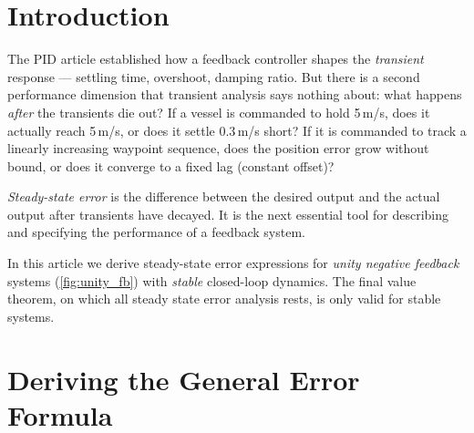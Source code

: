 \documentclass[../../book.tex]{subfiles}
\begin{document}
\graphicspath{{./}}

\section{Introduction}
\label{sec:intro}

The PID article established how a feedback controller shapes the \emph{transient}
response --- settling time, overshoot, damping ratio.  But there is a second
performance dimension that transient analysis says nothing about: what happens
\emph{after} the transients die out?  If a vessel is commanded to hold 5\,m/s,
does it actually reach 5\,m/s, or does it settle 0.3\,m/s short?  If it is
commanded to track a linearly increasing waypoint sequence, does the position
error grow without bound, or does it converge to a fixed lag (constant offset)?

\emph{Steady-state error} is the difference between the desired output and the
actual output after transients have decayed.  It is the next essential tool for
describing and specifying the performance of a feedback system.


In this article we derive steady-state error expressions for
\emph{unity negative feedback} systems (\cref{fig:unity_fb}) with \emph{stable}
closed-loop dynamics.  The final value theorem, on which all steady state error analysis rests, is only valid
for stable systems. 

\section{Deriving the General Error Formula}
\label{sec:derivation}
\end{document}

